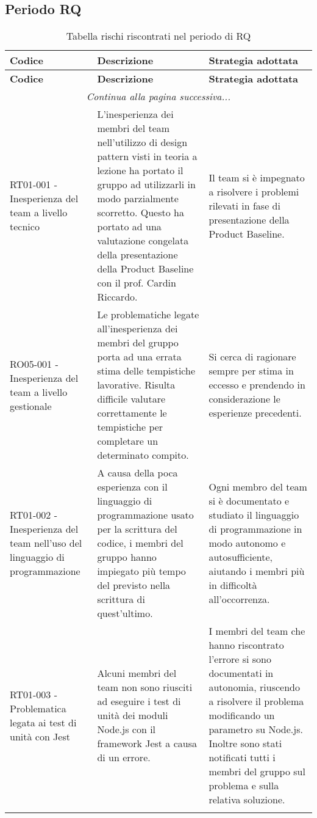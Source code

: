 \documentclass[../piano_di_progetto.tex]{subfiles}
\begin{document}
\subsection{Periodo RQ}
\label{sub:rischi_rq}
\begin{center}
	\begin{longtable}{|p{4cm}|p{6cm}|p{6cm}|}
		\hline
		\rowcolor{lightgray}
		{\textbf{Codice}} & {\textbf{Descrizione}} & {\textbf{Strategia adottata}} \\
		\hline
		\endfirsthead
	
		\hline
		\rowcolor{lightgray}
		{\textbf{Codice}} & {\textbf{Descrizione}} & {\textbf{Strategia adottata}} \\
		\hline
		\endhead
		
		\hline
		\multicolumn{3}{|c|}{\emph{Continua alla pagina successiva...}}\\
		\hline
		\endfoot

		\endlastfoot
        RT01-001 - Inesperienza del team a livello tecnico
        & L'inesperienza dei membri del team nell'utilizzo di design pattern visti in teoria a lezione ha portato il gruppo ad utilizzarli in modo parzialmente scorretto. Questo ha portato ad una valutazione congelata della presentazione della Product Baseline con il prof. Cardin Riccardo. 
		& Il team si è impegnato a risolvere i problemi rilevati in fase di presentazione della Product Baseline. \\
		
		RO05-001 - Inesperienza del team a livello gestionale
        & Le problematiche legate all'inesperienza dei membri del gruppo porta ad una errata stima delle tempistiche lavorative. Risulta difficile valutare correttamente le tempistiche per completare un determinato compito. 
        & Si cerca di ragionare sempre per stima in eccesso e prendendo in considerazione le esperienze precedenti.\\
		
		RT01-002 - Inesperienza del team nell'uso del linguaggio di programmazione
        & A causa della poca esperienza con il linguaggio di programmazione usato per la scrittura del codice, i membri del gruppo hanno impiegato più tempo del previsto nella scrittura di quest'ultimo.
		& Ogni membro del team si è documentato e studiato il linguaggio di programmazione in modo autonomo e autosufficiente, aiutando i membri più in difficoltà all'occorrenza.\\
		
		RT01-003 - Problematica legata ai test di unità con Jest
		& Alcuni membri del team non sono riusciti ad eseguire i test di unità dei moduli Node.js con il framework Jest a causa di un errore.
		& I membri del team che hanno riscontrato l'errore si sono documentati in autonomia, riuscendo a risolvere il problema modificando un parametro su Node.js. Inoltre sono stati notificati tutti i membri del gruppo sul problema e sulla relativa soluzione. \\
		\hline
		\rowcolor{white}
		\caption{Tabella rischi riscontrati nel periodo di RQ}
	\end{longtable}

\end{center}
\end{document}
